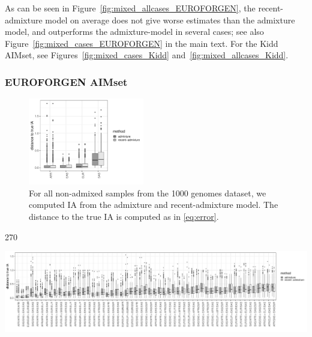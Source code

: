 \documentclass[12pt]{article}
\theoremstyle{definition}
\begin{document}
As can be seen in Figure~\ref{fig:mixed_allcases_EUROFORGEN}, the
recent-admixture model on average does not give worse estimates than the admixture
model, and outperforms the admixture-model in several cases; see also
Figure~\ref{fig:mixed_cases_EUROFORGEN} in the main text. For the
Kidd AIMset, see Figures~\ref{fig:mixed_cases_Kidd}
and~\ref{fig:mixed_allcases_Kidd}.

\subsubsection*{EUROFORGEN AIMset}

\begin{figure}[H]
  \begin{center}
    \includegraphics[width=0.45\textwidth]{deviations_nonmixed_EUROFORGEN.pdf}
  \end{center}
  \caption{\label{fig:nonmixed_EUROFORGEN} For all non-admixed samples
    from the 1000 genomes dataset, we computed IA from the admixture
    and recent-admixture model. The distance to the true IA is
    computed as in \eqref{eq:error}.}
\end{figure}

\begin{center}
  \begin{turn}{270}%
    \begin{minipage}{\textheight}
      \includegraphics[width=\textwidth]{deviations_mixed_allcases_EUROFORGEN.pdf}
      \label{fig:mixed_allcases_EUROFORGEN}
    \end{minipage}
  \end{turn}  
\end{center}
       
\end{document}
